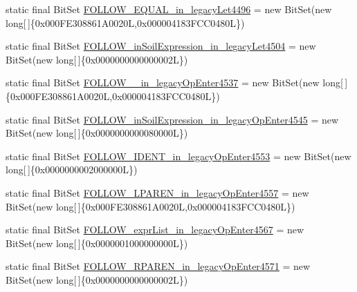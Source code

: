 \begin{DoxyCompactItemize}
\item 
static final Bit\-Set \hyperlink{classorg_1_1tzi_1_1use_1_1parser_1_1testsuite_1_1_test_suite_parser_a929153d1a519f781fd68d7b1e839b46e}{F\-O\-L\-L\-O\-W\-\_\-\-E\-Q\-U\-A\-L\-\_\-in\-\_\-legacy\-Let4496} = new Bit\-Set(new long\mbox{[}$\,$\mbox{]}\{0x000\-F\-E308861\-A0020\-L,0x000004183\-F\-C\-C0480\-L\})
\item 
static final Bit\-Set \hyperlink{classorg_1_1tzi_1_1use_1_1parser_1_1testsuite_1_1_test_suite_parser_a8701533388b6cf157cdc062d6a60d6f2}{F\-O\-L\-L\-O\-W\-\_\-in\-Soil\-Expression\-\_\-in\-\_\-legacy\-Let4504} = new Bit\-Set(new long\mbox{[}$\,$\mbox{]}\{0x0000000000000002\-L\})
\item 
static final Bit\-Set \hyperlink{classorg_1_1tzi_1_1use_1_1parser_1_1testsuite_1_1_test_suite_parser_a2aea2b748c9389937b2ade23a40f8678}{F\-O\-L\-L\-O\-W\-\_\-\_\-in\-\_\-legacy\-Op\-Enter4537} = new Bit\-Set(new long\mbox{[}$\,$\mbox{]}\{0x000\-F\-E308861\-A0020\-L,0x000004183\-F\-C\-C0480\-L\})
\item 
static final Bit\-Set \hyperlink{classorg_1_1tzi_1_1use_1_1parser_1_1testsuite_1_1_test_suite_parser_a6cb4b5a6aef13f5f19ec26d5a9769958}{F\-O\-L\-L\-O\-W\-\_\-in\-Soil\-Expression\-\_\-in\-\_\-legacy\-Op\-Enter4545} = new Bit\-Set(new long\mbox{[}$\,$\mbox{]}\{0x0000000000080000\-L\})
\item 
static final Bit\-Set \hyperlink{classorg_1_1tzi_1_1use_1_1parser_1_1testsuite_1_1_test_suite_parser_a6ecc434b0e44998df37d633f3e7ace7e}{F\-O\-L\-L\-O\-W\-\_\-\-I\-D\-E\-N\-T\-\_\-in\-\_\-legacy\-Op\-Enter4553} = new Bit\-Set(new long\mbox{[}$\,$\mbox{]}\{0x0000000002000000\-L\})
\item 
static final Bit\-Set \hyperlink{classorg_1_1tzi_1_1use_1_1parser_1_1testsuite_1_1_test_suite_parser_a529c49b5065d4d40c3e79883411e1a6d}{F\-O\-L\-L\-O\-W\-\_\-\-L\-P\-A\-R\-E\-N\-\_\-in\-\_\-legacy\-Op\-Enter4557} = new Bit\-Set(new long\mbox{[}$\,$\mbox{]}\{0x000\-F\-E308861\-A0020\-L,0x000004183\-F\-C\-C0480\-L\})
\item 
static final Bit\-Set \hyperlink{classorg_1_1tzi_1_1use_1_1parser_1_1testsuite_1_1_test_suite_parser_aa78c8a59fd48f7208a705ebdffb5522a}{F\-O\-L\-L\-O\-W\-\_\-expr\-List\-\_\-in\-\_\-legacy\-Op\-Enter4567} = new Bit\-Set(new long\mbox{[}$\,$\mbox{]}\{0x0000001000000000\-L\})
\item 
static final Bit\-Set \hyperlink{classorg_1_1tzi_1_1use_1_1parser_1_1testsuite_1_1_test_suite_parser_a47394bb6030020831f3ebdf99e49bf8a}{F\-O\-L\-L\-O\-W\-\_\-\-R\-P\-A\-R\-E\-N\-\_\-in\-\_\-legacy\-Op\-Enter4571} = new Bit\-Set(new long\mbox{[}$\,$\mbox{]}\{0x0000000000000002\-L\})

\end{DoxyCompactItemize}
